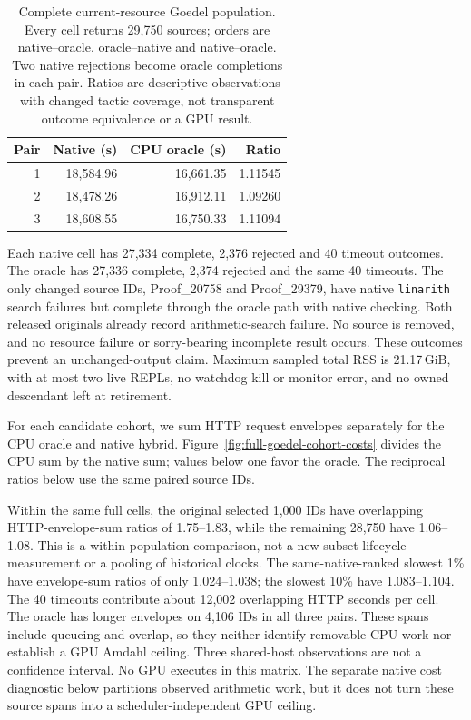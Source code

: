 \documentclass[10pt,twocolumn]{article}
\begin{document}
\begin{table}[t]
\centering
\small
\begin{tabular}{rrrr}
\toprule
Pair & Native (s) & CPU oracle (s) & Ratio \\
\midrule
1 &18,584.96&16,661.35&1.11545\\
2 &18,478.26&16,912.11&1.09260\\
3 &18,608.55&16,750.33&1.11094\\
\bottomrule
\end{tabular}
\caption{Complete current-resource Goedel population. Every cell returns
29,750 sources; orders are native--oracle, oracle--native and
native--oracle. Two native rejections become oracle completions in each
pair. Ratios are descriptive observations with changed tactic coverage,
not transparent outcome equivalence or a GPU result.}
\label{tab:full-goedel-power}
\end{table}

Each native cell has 27,334 complete, 2,376 rejected and 40 timeout outcomes.
The oracle has 27,336 complete, 2,374 rejected and the same 40 timeouts.
The only changed source IDs, Proof\_20758 and Proof\_29379, have native
\texttt{linarith} search failures but complete through the oracle path with
native checking. Both released originals already record arithmetic-search
failure. No source is removed, and no resource failure or sorry-bearing
incomplete result occurs. These outcomes prevent an unchanged-output claim.
Maximum sampled total RSS is 21.17\,GiB, with at most two live REPLs,
no watchdog kill or monitor error, and no owned descendant left at retirement.

For each candidate cohort, we sum HTTP request envelopes separately for the
CPU oracle and native hybrid. Figure~\ref{fig:full-goedel-cohort-costs}
divides the CPU sum by the native sum; values below one favor the oracle.
The reciprocal ratios below use the same paired source IDs.

Within the same full cells, the original selected 1,000 IDs have overlapping
HTTP-envelope-sum ratios of 1.75--1.83, while the remaining 28,750 have
1.06--1.08. This is a within-population comparison, not a new subset
lifecycle measurement or a pooling of historical clocks.
The same-native-ranked slowest 1\% have envelope-sum ratios of only
1.024--1.038; the slowest 10\% have 1.083--1.104.
The 40 timeouts contribute about 12,002 overlapping HTTP seconds per cell.
The oracle has longer envelopes on 4,106 IDs in all three pairs.
These spans include queueing and overlap, so they neither identify removable
CPU work nor establish a GPU Amdahl ceiling.
Three shared-host observations are not a confidence interval.
No GPU executes in this matrix. The separate native cost diagnostic below
partitions observed arithmetic work, but it does not turn these source spans
into a scheduler-independent GPU ceiling.
\end{document}
